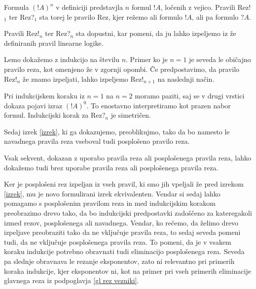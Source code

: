 \begin{opomba}
    Formula $(!A)^n$ v definiciji predstavjla $n$ formul $!A$, ločenih z vejico. Pravili Rez!$_{1}$ ter Rez?$_{1}$ sta torej le pravilo Rez, kjer režemo ali formulo $!A$, ali pa formulo $?A$.
\end{opomba}

\begin{lema}
    Pravili Rez!$_n$ ter Rez?$_{n}$ sta dopustni, kar pomeni, da ju lahko izpeljemo iz že definiranih pravil linearne logike.
\end{lema}

\begin{dokaz}
    Lemo dokažemo z indukcijo na številu $n$. Primer ko je $n=1$ je seveda le običajno pravilo reza, kot omenjeno že v zgornji opombi. Če predpostavimo, da pravilo Rez!$_n$ že znamo izpeljati, lahko izpeljemo Rez!$_{n+1}$ na naslednji način.
    \begin{prooftree}

    \end{prooftree}
    Pri indukcijskem koraku iz $n=1$ na $n=2$ moramo paziti, saj se v drugi vrstici dokaza pojavi izraz $(!A)^0$. To enostavno interpretiramo kot prazen nabor formul. Indukcijski korak za Rez?$_{n}$ je simetričen.
\end{dokaz}

Sedaj izrek \ref{izrek}, ki ga dokazujemo, preoblikujmo, tako da bo namesto le navadnega pravila reza vseboval tudi  posplošeno pravilo reza.
\begin{izrek}
    Vsak sekvent, dokazan z uporabo pravila reza ali posplošenega pravila reza, lahko dokažemo tudi brez uporabe pravila reza ali posplošenega pravila reza.
\end{izrek}
Ker je posplošeni rez izpeljan iz vseh pravil, ki smo jih vpeljali že pred izrekom \ref{izrek}, mu je novo formulirani izrek ekvivalenten. Vendar si sedaj lahko pomagamo s posplošenim pravilom reza in med indukcijskim korakom preobrazimo drevo tako, da bo indukcijski predpostavki zadoščeno za kateregakoli izmed rezov, posplošenega ali navadnega. Vendar, ko rečemo, da želimo drevo izpeljave preobraziti tako da ne vključuje pravila reza, to sedaj seveda pomeni tudi, da ne vključuje posplošenega pravila reza. To pomeni, da je v vsakem koraku indukcije potrebno obravnati tudi eliminacijo posplošenega reza. Seveda pa slednje obravnava le rezanje eksponentov, zato ni relevantno pri primerih koraka indukcije, kjer eksponentov ni, kot na primer pri vseh primerih eliminacije glavnega reza iz podpoglavja \ref{gl rez vezniki}.

